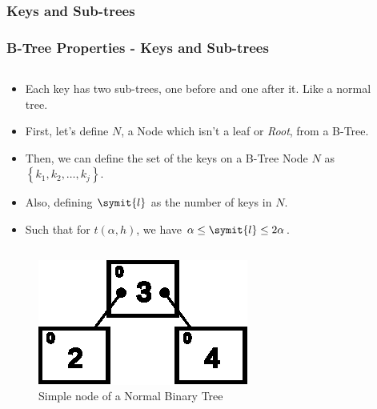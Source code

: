 \documentclass{beamer}
\begin{document}
\begin{frame}
    \subsubsection{Keys and Sub-trees}
    \frametitle{B-Tree Properties - Keys and Sub-trees}
    \begin{columns}
        \begin{column}{\textlecolumn}
            \begin{block}{}
                \vspace{-0.8cm}
                \begin{itemize}
                    \item Each key has two sub-trees, one before and one after it. Like a normal tree.
                    \item First, let's define \(N\), a Node which isn't a leaf or \emph{Root}, from a B-Tree.
                    \item Then, we can define the set of the keys on a B-Tree Node \(N\) as \(\left\{k_1, k_2, \ldots{}, k_j\right\}\).
                    \item Also, defining \(\symit{l}\) as the number of keys in \(N\).
                    \item Such that for \(t\left(\alpha, h\right)\), we have \(\alpha \leq \symit{l} \leq 2\alpha\).
                \end{itemize}
            \end{block}
        \end{column}
        \begin{column}{\textricolumn}
        \end{column}
    \end{columns}
    \begin{figure}[h!]
        \includegraphics[height=0.175\linewidth]{resources/made/btree_2subtrees.eps}
        \caption{Simple node of a Normal Binary Tree}
    \end{figure}

    \framebreak


\end{frame}
\end{document}
